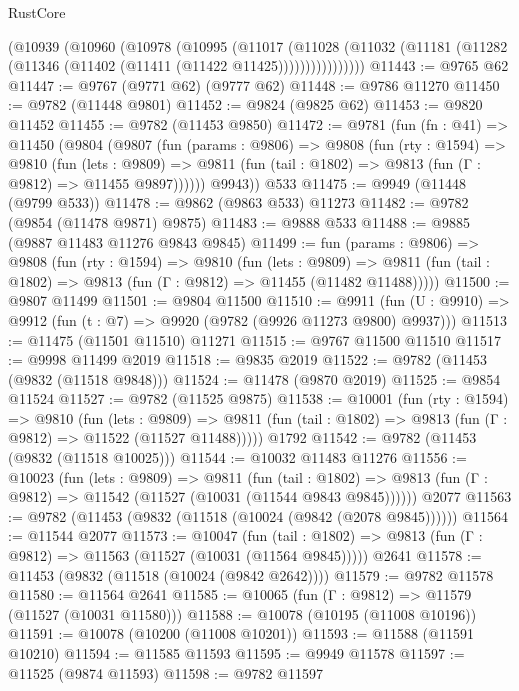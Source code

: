 \begin{lexlean}{RustCore}
\begin{coremodule}
          (@10939
            (@10960
              (@10978
                (@10995
                  (@11017
                    (@11028
                      (@11032 (@11181 (@11282 (@11346 (@11402 (@11411 (@11422 @11425))))))))))))))))
@11443 := @9765 @62
@11447 := @9767 (@9771 @62) (@9777 @62)
@11448 := @9786 @11270
@11450 := @9782 (@11448 @9801)
@11452 := @9824 (@9825 @62)
@11453 := @9820 @11452
@11455 := @9782 (@11453 @9850)
@11472 := @9781
    (fun (fn : @41) =>
    @11450
      (@9804
        (@9807
          (fun (params : @9806) =>
          @9808
            (fun (rty : @1594) =>
            @9810
              (fun (lets : @9809) =>
              @9811 (fun (tail : @1802) => @9813 (fun (Γ : @9812) => @11455 @9897))))))
        @9943))
    @533
@11475 := @9949 (@11448 (@9799 @533))
@11478 := @9862 (@9863 @533) @11273
@11482 := @9782 (@9854 (@11478 @9871) @9875)
@11483 := @9888 @533
@11488 := @9885 (@9887 @11483 @11276 @9843 @9845)
@11499 := fun (params : @9806) =>
  @9808
    (fun (rty : @1594) =>
    @9810
      (fun (lets : @9809) =>
      @9811 (fun (tail : @1802) => @9813 (fun (Γ : @9812) => @11455 (@11482 @11488)))))
@11500 := @9807 @11499
@11501 := @9804 @11500
@11510 := @9911
    (fun (U : @9910) => @9912 (fun (t : @7) => @9920 (@9782 (@9926 @11273 @9800) @9937)))
@11513 := @11475 (@11501 @11510) @11271
@11515 := @9767 @11500 @11510
@11517 := @9998 @11499 @2019
@11518 := @9835 @2019
@11522 := @9782 (@11453 (@9832 (@11518 @9848)))
@11524 := @11478 (@9870 @2019)
@11525 := @9854 @11524
@11527 := @9782 (@11525 @9875)
@11538 := @10001
    (fun (rty : @1594) =>
    @9810
      (fun (lets : @9809) =>
      @9811 (fun (tail : @1802) => @9813 (fun (Γ : @9812) => @11522 (@11527 @11488)))))
    @1792
@11542 := @9782 (@11453 (@9832 (@11518 @10025)))
@11544 := @10032 @11483 @11276
@11556 := @10023
    (fun (lets : @9809) =>
    @9811
      (fun (tail : @1802) =>
      @9813 (fun (Γ : @9812) => @11542 (@11527 (@10031 (@11544 @9843 @9845))))))
    @2077
@11563 := @9782 (@11453 (@9832 (@11518 (@10024 (@9842 (@2078 @9845))))))
@11564 := @11544 @2077
@11573 := @10047
    (fun (tail : @1802) => @9813 (fun (Γ : @9812) => @11563 (@11527 (@10031 (@11564 @9845)))))
    @2641
@11578 := @11453 (@9832 (@11518 (@10024 (@9842 @2642))))
@11579 := @9782 @11578
@11580 := @11564 @2641
@11585 := @10065 (fun (Γ : @9812) => @11579 (@11527 (@10031 @11580)))
@11588 := @10078 (@10195 (@11008 @10196))
@11591 := @10078 (@10200 (@11008 @10201))
@11593 := @11588 (@11591 @10210)
@11594 := @11585 @11593
@11595 := @9949 @11578
@11597 := @11525 (@9874 @11593)
@11598 := @9782 @11597

\end{coremodule}
\end{lexlean}
